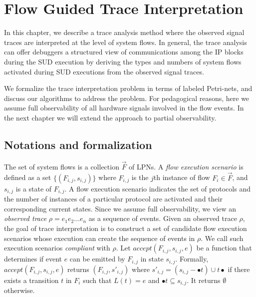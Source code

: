 \documentclass[12pt,frontmatter,copyright,thesis]{usfmanus}
\begin{document}
\chapter{Flow Guided Trace Interpretation}

 In this chapter,
 we describe a trace analysis method where the observed
 signal traces are interpreted at the level of system
 flows. In general, the trace analysis can offer
 debuggers a structured view of communications among the
 IP blocks during the SUD execution by deriving the types
 and numbers of system flows activated during SUD
 executions from the observed signal traces.

We formalize the trace interpretation problem in terms of labeled Petri-nets,
 and discuss our algorithms to address the problem.
  For pedagogical reasons, here we assume full observability of all hardware signals involved in the flow events. 
  In the next chapter we will extend the approach to partial observability.



 
\section{Notations and formalization}  The set
of system flows is a collection ${\vec{F}}$ of
LPNs.  A {\em flow execution scenario} is defined as a
set $\{(F_{i,j}, s_{i,j})\}$ where $F_{i,j}$ is the
$j$th instance of flow $F_i \in {\vec{F}}$, and $s_{i,j}$ is
a state of $F_{i,j}$.  A flow execution scenario indicates
the set of protocols and the number of instances of a
particular protocol are activated and their corresponding
current states.  Since we assume full observability, we view
an {\em observed trace} $\rho = e_1e_2\ldots e_n$ as a
sequence of events.  Given an observed trace $\rho$, the
goal of trace interpretation is to construct a set of
candidate flow execution scenarios whose execution can
create the sequence of events in $\rho$.  We call such
execution scenarios {\em compliant} with $\rho$.  Let
$\mathit{accept(F_{i,j}, s_{i,j}, e)}$ be a function that
determines if event $e$ can be emitted by $F_{i,j}$ in state
$s_{i,j}$.  Formally, $\mathit{accept(F_{i,j}, s_{i,j}, e)}$
returns $(F_{i,j}, s'_{i,j})$ where $s'_{i,j} = (s_{i,j} - \bullet t)
\cup t\bullet$ if there exists a transition
$t$ in $F_i$ such that $L(t) = e$ and $\bullet t \subseteq
s_{i,j}$.  It returns $\emptyset$ otherwise.
\end{document}
